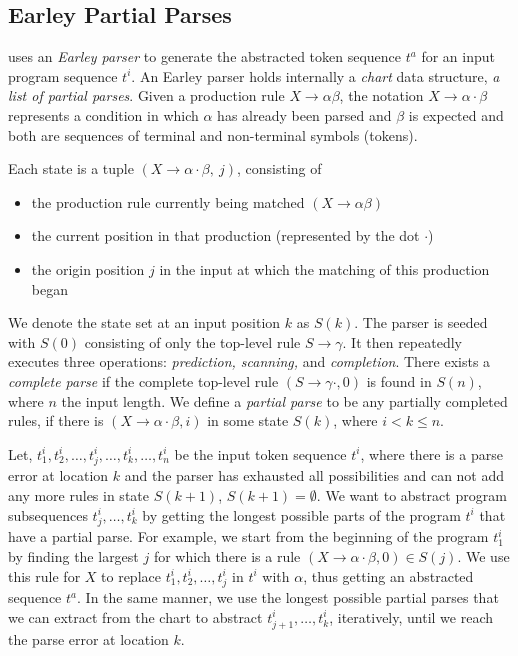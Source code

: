 \subsection{Earley Partial Parses}
\label{sec:prog-abstract:partial}

\toolname uses an \emph{Earley parser} to generate the abstracted token
sequence $t^a$ for an input program sequence $t^i$. An Earley parser holds
internally a \emph{chart} data structure, \ie \emph{a list of partial parses}.
Given a production rule $X \rightarrow \alpha \beta$, the notation $X
\rightarrow \alpha \cdot \beta$ represents a condition in which $\alpha$ has
already been parsed and $\beta$ is expected and both are sequences of terminal
and non-terminal symbols (tokens).

Each state is a tuple $(X \rightarrow \alpha \cdot \beta,\ j)$, consisting of
\begin{itemize}
    \item the production rule currently being matched $(X \rightarrow \alpha
    \beta)$
    \item the current position in that production (represented by the dot
    $\cdot$)
    \item the origin position $j$ in the input at which the matching of this
    production began
\end{itemize}

We denote the state set at an input position $k$ as $S(k)$. The parser is seeded
with $S(0)$ consisting of only the top-level rule $S \rightarrow \gamma$. It
then repeatedly executes three operations: \emph{prediction, scanning,} and
\emph{completion}. There exists a \emph{complete parse} if the complete
top-level rule $(S \rightarrow \gamma \cdot, 0)$ is found in $S(n)$, where $n$
the input length. We define a \emph{partial parse} to be any partially completed
rules, \ie if there is $(X \rightarrow \alpha \cdot \beta, i)$ in some state
$S(k)$, where $i < k \leq n$.


Let, $t^i_1, t^i_2, \dots, t^i_j, \dots, t^i_k, \dots, t^i_n$ be the
input token sequence $t^i$, where there is a parse error at location $k$ and the
parser has exhausted all possibilities and can not add any more rules in state
$S(k + 1)$, \ie $S(k + 1) = \emptyset$. We want to abstract program subsequences
$t^i_j, \dots, t^i_k$ by getting the longest possible parts of the program $t^i$
that have a partial parse. For example, we start from the beginning of the
program $t^i_1$ by finding the largest $j$ for which there is a rule $(X
\rightarrow \alpha \cdot \beta, 0) \in S(j)$. We use this rule for $X$ to
replace $t^i_1, t^i_2, \dots, t^i_j$ in $t^i$ with $\alpha$, thus getting an
abstracted sequence $t^a$. In the same manner, we use the longest possible
partial parses that we can extract from the chart to abstract $t^i_{j+1}, \dots,
t^i_k$, iteratively, until we reach the parse error at location $k$.

